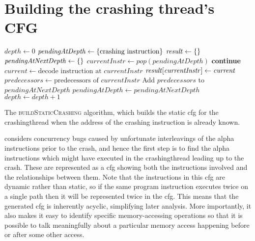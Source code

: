 \section{Building the crashing thread's CFG}
\label{sect:derive:build_crashing_cfg}

\begin{sanefig}
\begin{algorithmic}
\State $\mathit{depth} \gets 0$
\State $\mathit{pendingAtDepth} \gets \{\text{crashing instruction}\}$
\State $\mathit{result} \gets \{\}$
  \State $\mathit{pendingAtNextDepth} \gets \{\}$
    \State $\mathit{currentInstr} \gets \mathit{pop}(\mathit{pendingAtDepth})$
      \State \textbf{continue}
    \EndIf
    \State $\mathit{current} \gets \text{decode instruction at } \mathit{currentInstr}$
    \State $\mathit{result}[\mathit{currentInstr}] \gets \mathit{current}$
    \State $\mathit{predecessors} \gets \text{predecessors of } \mathit{currentInstr}$
    \State Add $\mathit{predecessors}$ to $\mathit{pendingAtNextDepth}$
  \EndWhile
  \State $\mathit{pendingAtDepth} \gets \mathit{pendingAtNextDepth}$
  \State $\mathit{depth} \gets \mathit{depth} + 1$
\EndWhile
\EndFunction
\end{algorithmic}
\vspace{-6pt}
\caption{The \textsc{buildStaticCrashing} algorithm, which builds the
  static \protect\gls{cfg} for the \protect\gls{crashingthread} when
  the address of the crashing instruction is already known.}
\label{fig:derive:static_read_cfg_single_function}
\end{sanefig}

\noindent
{\Technique} considers concurrency bugs caused by unfortunate
interleavings of the \gls{alpha} instructions prior to the crash, and
hence the first step is to find the \gls{alpha} instructions which
might have executed in the \gls{crashingthread} leading up to the
crash.  These are represented as a \gls{cfg} showing both the
instructions involved and the relationships between them.  Note that
the instructions in this \gls{cfg} are dynamic rather than static, so
if the same program instruction executes twice on a single path then
it will be represented twice in the \gls{cfg}.  This means that the
generated \gls{cfg} is inherently acyclic, simplifying later analysis.
More importantly, it also makes it easy to identify specific
memory-accessing operations so that it is possible to talk
meaningfully about a particular memory access happening before or
after some other access.

